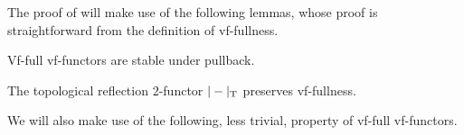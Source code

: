 
The proof of  will make use of the following lemmas, whose proof is straightforward from the definition of vf-fullness.

\begin{lem}\label{lem:vf-fullness-stable-pullback}
    Vf-full vf-functors are stable under pullback.
\end{lem}

\begin{lem}\label{lem:tref-preserves-vf-fullness}
    The topological reflection 2-functor $|-|_\mathrm{T}$ preserves vf-fullness.
\end{lem}

We will also make use of the following, less trivial, property of vf-full vf-functors.

